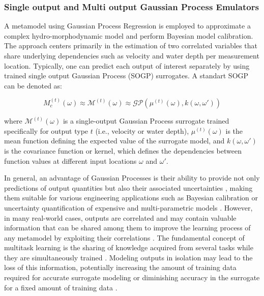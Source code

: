 \documentclass[draft,linenumbers,onecolumn]{agujournal2019} %
\begin{document}
\subsubsection{Single output and Multi output Gaussian Process Emulators}


A metamodel using Gaussian Process Regression is employed to approximate a complex hydro-morphodynamic model and perform Bayesian model calibration. The approach centers primarily in the estimation of two correlated variables that share underlying dependencies such as velocity and water depth per measurement location. Typically, one can predict each output of interest separately by using trained single output Gaussian Process (SOGP) surrogates. A standart SOGP can be denoted as:

\[
M_c^{(t)}(\omega) \approx \mathcal{M}^{(t)}(\omega) \approx \mathcal{GP}(\mu^{(t)}(\omega), k(\omega, \omega'))
\]

where \( \mathcal{M}^{(t)}(\omega) \) is a single-output Gaussian Process surrogate trained specifically for output type \( t \) (i.e., velocity or water depth), \( \mu^{(t)}(\omega) \) is the mean function defining the expected value of the surrogate model, and \( k(\omega, \omega') \) is the covariance function or kernel, which defines the dependencies between function values at different input locations \( \omega \) and \( \omega' \). 

In general, an advantage of Gaussian Processes is their ability to provide not only predictions of output quantities but also their associated uncertainties \cite{lindholm2022machine}, making them suitable for various engineering applications such as Bayesian calibration or uncertainty quantification of expensive and multi-parametric models \cite{schwindt2023bayesian, mouris2023stability}. However, in many real-world cases, outputs are correlated and may contain valuable information that can be shared among them to improve the learning process of any metamodel by exploiting their correlations \cite{breiman1997predicting}. The fundamental concept of multitask learning is the sharing of knowledge acquired from several tasks while they are simultaneously trained \cite{caruana1997multitask}. Modeling outputs in isolation may lead to the loss of this information, potentially increasing the amount of training data required for accurate surrogate modeling or diminishing accuracy in the surrogate for a fixed amount of training data \cite{liu2018remarks}.
\end{document}
